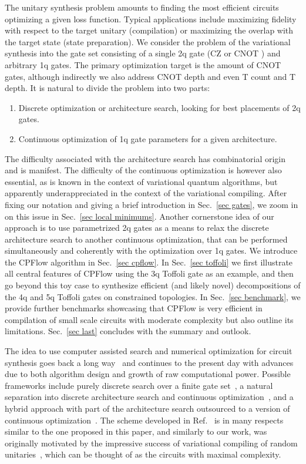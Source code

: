 \documentclass[twocolumn, amsfonts, amssymb, aps, nofootinbib]{revtex4-2}
\newcommand{\CZ}{\textsf{CZ }}
\newcommand{\CX}{\textsf{CNOT }}
\newcommand{\T}{\textsf{T }}
\newcommand{\package}[1]{\textrm {#1 }}
\newcommand{\cpflow}{\package{CPFlow}}
\begin{document}
The unitary synthesis problem amounts to finding the most efficient circuits optimizing a given loss function. Typical applications include maximizing fidelity with respect to the target unitary (compilation) or maximizing the overlap with the target state (state preparation). We consider the problem of the variational synthesis into the gate set consisting of a single 2q gate (\CZ or \CX) and arbitrary 1q gates. The primary optimization target is the amount of \CX gates, although indirectly we also address \CX depth and even \T count and \T depth. It is natural to divide the problem into two parts:
\begin{enumerate}[label=(\roman*), nosep]
	\item Discrete optimization or architecture search, looking for best placements of 2q gates.
	\item Continuous optimization of 1q gate parameters for a given architecture.
\end{enumerate}
The difficulty associated with the architecture search has combinatorial origin and is manifest. The difficulty of the continuous optimization is however also essential, as is known in the context of variational quantum algorithms, but apparently underappreciated in the context of the variational compiling. After fixing our notation and giving a brief introduction in Sec.~\ref{sec gates}, we zoom in on this issue in Sec.~\ref{sec local minimums}. Another cornerstone idea of our approach is to use parametrized 2q gates as a means to relax the discrete architecture search to another continuous optimization, that can be performed simultaneously and coherently with the optimization over 1q gates. We introduce the \cpflow algorithm in Sec.~\ref{sec cpflow}. In Sec.~\ref{sec toffoli} we first illustrate all central features of \cpflow using the 3q Toffoli gate as an example, and then go beyond this toy case to synthesize efficient (and likely novel) decompositions of the 4q and 5q Toffoli gates on constrained topologies. In Sec.~\ref{sec benchmark}, we provide further benchmarks showcasing that \cpflow is very efficient in compilation of small scale circuits with moderate complexity but also outline its limitations. Sec.~\ref{sec last} concludes with the summary and outlook.

The idea to use computer assisted search and numerical optimization for circuit synthesis goes back a long way~\cite{Divincenzo1994} and continues to the present day with advances due to both algorithm design and growth of raw computational power. Possible frameworks include purely discrete search over a finite gate set~\cite{Nagarajan2021}, a natural separation into discrete architecture search and continuous optimization~\cite{Nam2018, Khatri2019, Smith2021}, and a hybrid approach with part of the architecture search outsourced to a version of continuous optimization~\cite{Younis2021, Rakyta2022}. The scheme developed in Ref.~\cite{Rakyta2022} is in many respects similar to the one proposed in this paper, and similarly to our work, was originally motivated by the impressive success of variational compiling of random unitaries~\cite{Kiani2020, Madden2021, Rakyta2021}, which can be thought of as the circuits with maximal complexity.
\end{document}
